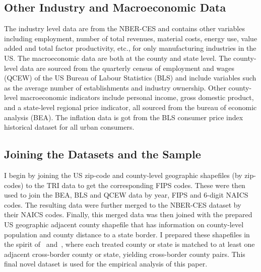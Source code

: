 \documentclass[12pt, english]{article}
\begin{document}
    \subsection{Other Industry and Macroeconomic Data}\label{subsec:other-industry-and-macroeconomic-data}
    The industry level data are from the NBER-CES and contains other variables including employment, number of total revenues, material costs, energy use, value added and total factor productivity, etc., for only manufacturing industries in the US. The macroeconomic data are both at the county and state level. The county-level data are sourced from the quarterly census of employment and wages (QCEW) of the US Bureau of Labour Statistics (BLS) and include variables such as the average number of establishments and industry ownership. Other county-level macroeconomic indicators include personal income, gross domestic product, and a state-level regional price indicator, all sourced from the bureau of economic analysis (BEA). The inflation data is got from the BLS consumer price index historical dataset for all urban consumers.

    \subsection{Joining the Datasets and the Sample}\label{subsec:joining-the-datasets-and-the-sample}
    I begin by joining the US zip-code and county-level geographic shapefiles (by zip-codes) to the TRI data to get the corresponding FIPS codes. These were then used to join the BEA, BLS and QCEW data by year, FIPS and $6$-digit NAICS codes. The resulting data were further merged to the NBER-CES dataset by their NAICS codes. Finally, this merged data was then joined with the prepared US geographic adjacent county shapefile that has information on county-level population and county distance to a state border. I prepared these shapefiles in the spirit of~\cite{dube2010minimum} and~\cite{gopalan2021state}, where each treated county or state is matched to at least one adjacent cross-border county or state, yielding cross-border county pairs. This final novel dataset is used for the empirical analysis of this paper.
\end{document}
